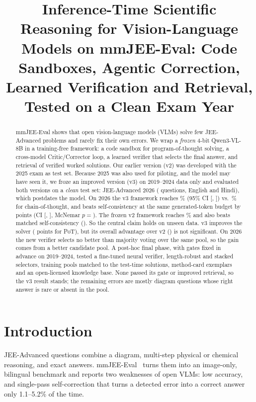 \documentclass[conference]{IEEEtran}
\begin{document}
\title{Inference-Time Scientific Reasoning for Vision-Language Models on mmJEE-Eval:
Code Sandboxes, Agentic Correction, Learned Verification and Retrieval, Tested on a Clean Exam Year}
\author{
}
\maketitle

\begin{abstract}
mmJEE-Eval shows that open vision-language models (VLMs) solve few JEE-Advanced problems and
rarely fix their own errors. We wrap a \emph{frozen} 4-bit Qwen3-VL-8B in a training-free
framework: a code sandbox for program-of-thought solving, a cross-model Critic/Corrector loop, a
learned verifier that selects the final answer, and retrieval of verified worked solutions. Our
earlier version (v2) was developed with the 2025 exam as test set. Because 2025 was also used for
piloting, and the model may have seen it, we froze an improved version (v3) on 2019--2024 data
only and evaluated both versions on a \emph{clean} test set: JEE-Advanced 2026 (\NTest{} questions,
English and Hindi), which postdates the model. On 2026 the v3 framework reaches \ThreeAcc\% (95\%
CI [\ThreeLo, \ThreeHi]) vs.\ \ThreeBase\% for chain-of-thought, and beats self-consistency at
the same generated-token budget by \ThreeVsSc{} points (CI [\ThreeVsScLo, \ThreeVsScHi], McNemar
$p{=}$\ThreeVsScP). The frozen v2 framework reaches \TwoAcc\% and also beats matched
self-consistency (\TwoVsSc{}). So the central claim holds on unseen data. v3 improves the solver
(\PotVsDiff{} points for PoT), but its overall advantage over v2 (\VsDiff) is not significant.
On 2026 the new verifier selects no better than majority voting over the same pool, so the gain
comes from a better candidate pool. A post-hoc final phase, with gates fixed in advance on
2019--2024, tested a fine-tuned neural verifier, length-robust and stacked selectors, training
pools matched to the test-time solutions, method-card exemplars and an open-licensed knowledge
base. None passed its gate or improved retrieval, so the v3 result stands; the remaining errors
are mostly diagram questions whose right answer is rare or absent in the pool.
\end{abstract}

\section{Introduction}
JEE-Advanced questions combine a diagram, multi-step physical or chemical reasoning, and exact
answers. mmJEE-Eval~\cite{mmjee} turns them into an image-only, bilingual benchmark and reports
two weaknesses of open VLMs: low accuracy, and single-pass self-correction that turns a detected
error into a correct answer only 1.1--5.2\% of the time.
\end{document}
